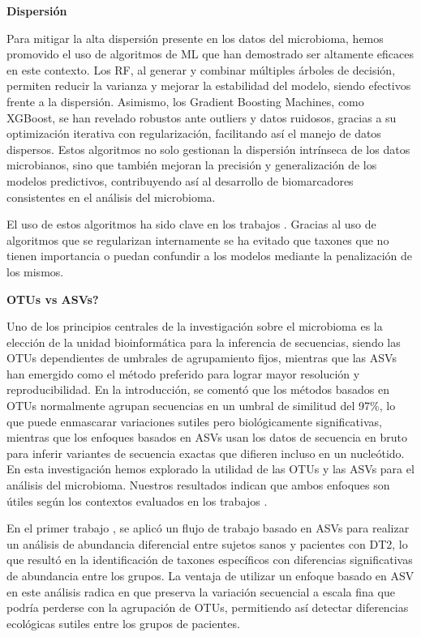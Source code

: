 \textbf{Dispersión}

Para mitigar la alta dispersión presente en los datos del microbioma, hemos promovido el uso de algoritmos de ML que han demostrado ser altamente eficaces en este contexto. Los RF, al generar y combinar múltiples árboles de decisión, permiten reducir la varianza y mejorar la estabilidad del modelo, siendo efectivos frente a la dispersión. Asimismo, los Gradient Boosting Machines, como XGBoost, se han revelado robustos ante outliers y datos ruidosos, gracias a su optimización iterativa con regularización, facilitando así el manejo de datos dispersos. Estos algoritmos no solo gestionan la dispersión intrínseca de los datos microbianos, sino que también mejoran la precisión y generalización de los modelos predictivos, contribuyendo así al desarrollo de biomarcadores consistentes en el análisis del microbioma.

El uso de estos algoritmos ha sido clave en los trabajos \cite{paper2, paper3}. Gracias al uso de algoritmos que se regularizan internamente se ha evitado que taxones que no tienen importancia o puedan confundir a los modelos mediante la penalización de los mismos. 

\textbf{OTUs vs ASVs?}

Uno de los principios centrales de la investigación sobre el microbioma es la elección de la unidad bioinformática para la inferencia de secuencias, siendo las OTUs dependientes de umbrales de agrupamiento fijos, mientras que las ASVs han emergido como el método preferido para lograr mayor resolución y reproducibilidad. En la introducción, se comentó que los métodos basados en OTUs normalmente agrupan secuencias en un umbral de similitud del 97\%, lo que puede enmascarar variaciones sutiles pero biológicamente significativas, mientras que los enfoques basados en ASVs usan los datos de secuencia en bruto para inferir variantes de secuencia exactas que difieren incluso en un nucleótido. En esta investigación hemos explorado la utilidad de las OTUs y las ASVs para el análisis del microbioma. Nuestros resultados indican que ambos enfoques son útiles según los contextos evaluados en los trabajos \cite{paper1, paper2, paper3}.

En el primer trabajo \cite{paper1}, se aplicó un flujo de trabajo basado en ASVs para realizar un análisis de abundancia diferencial entre sujetos sanos y pacientes con DT2, lo que resultó en la identificación de taxones específicos con diferencias significativas de abundancia entre los grupos. La ventaja de utilizar un enfoque basado en ASV en este análisis radica en que preserva la variación secuencial a escala fina que podría perderse con la agrupación de OTUs, permitiendo así detectar diferencias ecológicas sutiles entre los grupos de pacientes.

